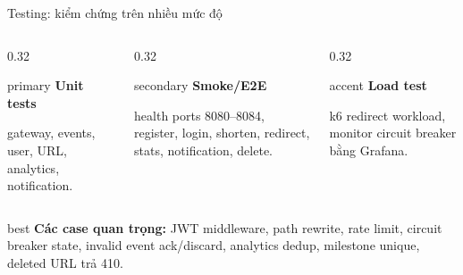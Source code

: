 \documentclass[aspectratio=169]{beamer}
\begin{document}
\begin{frame}{Testing: kiểm chứng trên nhiều mức độ}
    \begin{columns}[T,onlytextwidth]
        \begin{column}{0.32\textwidth}
            \begin{claimbox}{primary}
                \centering\textbf{Unit tests}\par\small
                gateway, events, user, URL, analytics, notification.
            \end{claimbox}
        \end{column}
        \begin{column}{0.32\textwidth}
            \begin{claimbox}{secondary}
                \centering\textbf{Smoke/E2E}\par\small
                health ports 8080--8084, register, login, shorten, redirect, stats, notification, delete.
            \end{claimbox}
        \end{column}
        \begin{column}{0.32\textwidth}
            \begin{claimbox}{accent}
                \centering\textbf{Load test}\par\small
                k6 redirect workload, monitor circuit breaker bằng Grafana.
            \end{claimbox}
        \end{column}
    \end{columns}
    \vspace{0.5cm}
    \begin{claimbox}{best}
        \small \textbf{Các case quan trọng:} JWT middleware, path rewrite, rate limit, circuit breaker state, invalid event ack/discard, analytics dedup, milestone unique, deleted URL trả 410.
    \end{claimbox}
\end{frame}
\end{document}
